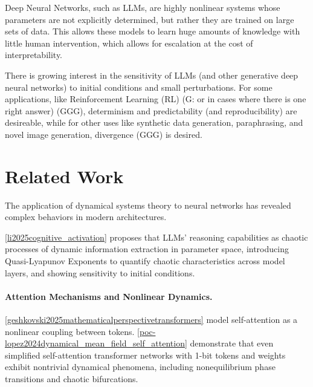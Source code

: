 \documentclass[a4paper,12pt]{article}
\begin{document}
Deep Neural Networks, such as LLMs, are highly nonlinear systems whose parameters are not explicitly determined, but rather they are trained on large sets of data. This allows these models to learn huge amounts of knowledge with little human intervention, which allows for escalation at the cost of interpretability.

There is growing interest in the sensitivity of LLMs (and other generative deep neural networks) to initial conditions and small perturbations. For some applications, like Reinforcement Learning (RL) (G: or in cases where there is one right answer) (GGG), determinism and predictability (and reproducibility) are desireable, while for other uses like synthetic data generation, paraphrasing, and novel image generation, divergence (GGG) is desired.



\section{Related Work}


The application of dynamical systems theory to neural networks has revealed complex behaviors in modern architectures.  

\ref{li2025cognitive_activation} proposes that LLMs' reasoning capabilities as chaotic processes of dynamic information extraction in parameter space, introducing Quasi-Lyapunov Exponents to quantify chaotic characteristics across model layers, and showing sensitivity to initial conditions.

\paragraph{Attention Mechanisms and Nonlinear Dynamics.}
\ref{geshkovski2025mathematicalperspectivetransformers} model self-attention as a nonlinear coupling between tokens.
\ref{poc-lopez2024dynamical_mean_field_self_attention} demonstrate that even simplified self-attention transformer networks with 1-bit tokens and weights exhibit nontrivial dynamical phenomena, including nonequilibrium phase transitions and chaotic bifurcations. 
\end{document}
